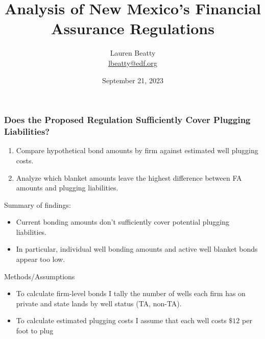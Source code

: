 \documentclass{beamer}
\title{Analysis of New Mexico's Financial Assurance Regulations}
\author{Lauren Beatty\\ \href{mailto:lbeatty@edf.org}{lbeatty@edf.org}}
\institute{Environmental Defense Fund}
\date{September 21, 2023}
\begin{document}
\frame{\titlepage}

\begin{frame}
\frametitle{Does the Proposed Regulation Sufficiently Cover Plugging Liabilities?}
    \begin{enumerate}
        \item Compare hypothetical bond amounts by firm against estimated well plugging costs.
        \item Analyze which blanket amounts leave the highest difference between FA amounts and plugging liabilities.
    \end{enumerate}
    Summary of findings:
    \begin{itemize}
        \item Current bonding amounts don't sufficiently cover potential plugging liabilities.
        \item In particular, individual well bonding amounts and active well blanket bonds appear too low.
    \end{itemize}
\end{frame}

\begin{frame}{Methods/Assumptions}
\label{BondCalc}
\vspace{-0.2cm}
\begin{itemize}
    \item To calculate firm-level bonds I tally the number of wells each firm has on private and state lands by well status (TA, non-TA).
    \item To calculate estimated plugging costs I assume that each well costs $\$12$ per foot to plug
\end{itemize}
\end{frame}
\end{document}
